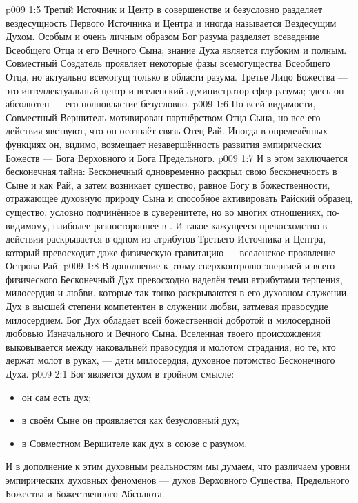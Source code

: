 \vs p009 1:5 \pc Третий Источник и Центр в совершенстве и безусловно разделяет вездесущность Первого Источника и Центра и иногда называется Вездесущим Духом. Особым и очень личным образом Бог разума разделяет всеведение Всеобщего Отца и его Вечного Сына; знание Духа является глубоким и полным. Совместный Создатель проявляет некоторые фазы всемогущества Всеобщего Отца, но актуально всемогущ только в области разума. Третье Лицо Божества --- это интеллектуальный центр и вселенский администратор сфер разума; здесь он абсолютен --- его полновластие безусловно.
\vs p009 1:6 По всей видимости, Совместный Вершитель мотивирован партнёрством Отца\hyp{}Сына, но все его действия явствуют, что он осознаёт связь Отец\hyp{}Рай. Иногда в определённых функциях он, видимо, возмещает незавершённость развития эмпирических Божеств --- Бога Верховного и Бога Предельного.
\vs p009 1:7 \pc И в этом заключается бесконечная тайна: Бесконечный одновременно раскрыл свою бесконечность в Сыне и как Рай, а затем возникает существо, равное Богу в божественности, отражающее духовную природу Сына и способное активировать Райский образец, существо, условно подчинённое в суверенитете, но во многих отношениях, по\hyp{}видимому, наиболее разностороннее в . И такое кажущееся превосходство в действии раскрывается в одном из атрибутов Третьего Источника и Центра, который превосходит даже физическую гравитацию --- вселенское проявление Острова Рай.
\vs p009 1:8 В дополнение к этому сверхконтролю энергией и всего физического Бесконечный Дух превосходно наделён теми атрибутами терпения, милосердия и любви, которые так тонко раскрываются в его духовном служении. Дух в высшей степени компетентен в служении любви, затмевая правосудие милосердием. Бог Дух обладает всей божественной добротой и милосердной любовью Изначального и Вечного Сына. Вселенная твоего происхождения выковывается между наковальней правосудия и молотом страдания, но те, кто держат молот в руках, --- дети милосердия, духовное потомство Бесконечного Духа.
\vs p009 2:1 Бог является духом в тройном смысле:\begin{itemize}\item он сам есть дух; \item в своём Сыне он проявляется как безусловный дух; \item в Совместном Вершителе как дух в союзе с разумом.\end{itemize} И в дополнение к этим духовным реальностям мы думаем, что различаем уровни эмпирических духовных феноменов --- духов Верховного Существа, Предельного Божества и Божественного Абсолюта.
